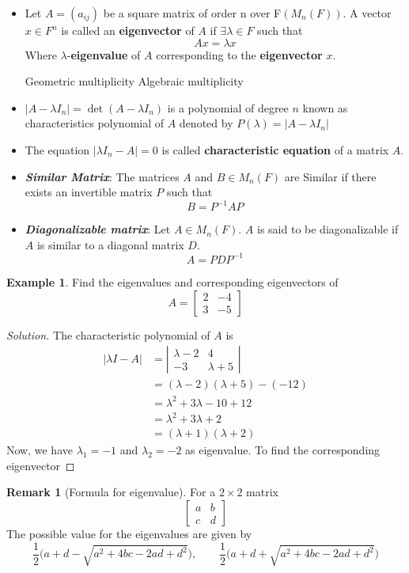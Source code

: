 \documentclass[12pt]{article}
\theoremstyle{definition}
\newtheorem*{rmk}{Remark}
\newtheorem{ex}{Example}
\begin{document}
\begin{itemize}
\item Let $A=(a_{ij})$ be a square matrix of order n over F$(M_n(F))$. A vector $x\in F^n$ is called an \textbf{eigenvector} of $A$ if $ \exists \lambda \in F$ such that
      \[Ax=\lambda x\]
  Where $\lambda$-\textbf{eigenvalue} of $A$ corresponding to the \textbf{eigenvector} $x$.

\subitem Geometric multiplicity
\subitem Algebraic multiplicity
\item  $|A-\lambda I_n|=\det(A-\lambda I_n)$ is a polynomial of degree $n$ known as characteristics polynomial of $A$ denoted by $P(\lambda )=|A-\lambda I_n|$
\item  The equation $|\lambda I_n -A|=0$ is called \textbf{characteristic equation} of a matrix $A$.
\item \emph{\textbf{Similar Matrix}}: The matrices $A$ and $B\in M_n(F)$ are Similar if there exists an invertible matrix $P$ such that
   \[B=P^{-1}AP\]
\item \emph{\textbf{Diagonalizable matrix}}: Let $A\in M_n(F)$. $A$ is said to be diagonalizable if $A$ is similar to a diagonal matrix $D$.
    \[A=PDP^{-1}\]

\end{itemize}
\newpage
\begin{ex}
Find the eigenvalues and corresponding eigenvectors of
\[A=\begin{bmatrix}
2 & -4\\
3 & -5
\end{bmatrix}\]
\end{ex}
\begin{proof}[Solution]
The characteristic polynomial of $A$ is
\begin{align*}
|\lambda I-A|&=\left|\begin{matrix} \lambda-2 & 4\\ -3 & \lambda+5 \end{matrix}\right|\\
             &=(\lambda-2)(\lambda+5)-(-12)\\
             &=\lambda^2+3\lambda-10+12\\
             &=\lambda^2+3\lambda+2\\
             &=(\lambda+1)(\lambda+2)
\end{align*}
Now, we have $\lambda_1=-1$ and $\lambda_2=-2$ as eigenvalue. To find the corresponding eigenvector
\end{proof}


\begin{rmk}[Formula for eigenvalue]
For a $2\times 2$ matrix
\[\begin{bmatrix} a & b\\ c & d \end{bmatrix}\]
The possible value for the eigenvalues are given by
\[\frac{1}{2}\biggl(a+d-\sqrt{a^2+4bc-2ad+d^2}\biggl),\qquad \frac{1}{2}\biggl(a+d+\sqrt{a^2+4bc-2ad+d^2}\biggl)\]
\end{rmk}
\end{document}
